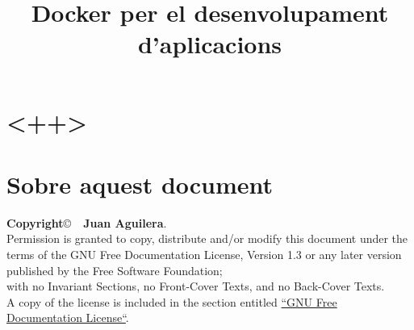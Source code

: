 \documentclass[a4paper]{article}
\begin{document}
\title{Docker per el desenvolupament d'aplicacions}
\maketitle

\begin{comment}
oddsidemargin \the\oddsidemargin \newline
textwidth \the\textwidth \newline
marginparsep \the\marginparsep \newline
marginparwidth \the\marginparwidth \newline
hoffset \the\hoffset \newline
paperwidth \the\paperwidth 
\end{comment}

\section{<++>}


\section{Sobre aquest document}
\textbf{Copyright}\copyright\ \textbf{\the\year\ Juan Aguilera}.\\
Permission is granted to copy, distribute and/or modify this document under the terms of the GNU Free Documentation License, Version 1.3 or any later version published by the Free Software Foundation;\\
with no Invariant Sections, no Front-Cover Texts, and no Back-Cover Texts.\\
A copy of the license is included in the section entitled \href{http://www.gnu.org/licenses/fdl.html}{``GNU Free Documentation License``}.

\begin{thebibliography}{99}
	\bibitem{<++>} 
\end{thebibliography}
\end{document}
